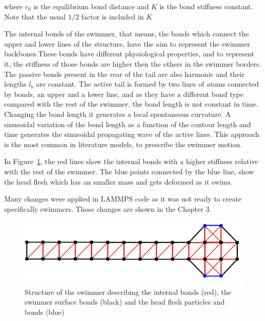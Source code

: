 where $r_{0}$ is the equilibrium bond distance and $K$ is the bond stiffness constant. Note that the usual $1/2$ factor is included in $K$ 

The internal bonds of the swimmer, that means, the bonds which connect the upper and lower lines of the structure, have the aim to represent the swimmer backbones.These bonds have
different physiological properties, and to represent it, the stiffness of those bonds are higher then the others in the swimmer borders. The passive bonds present in the 
rear of the tail are also harmonic and their lengths $l_{b}$ are constant. The active tail is formed by two lines of atoms connected by bonds, an upper and a lower line, and as
they have a different bond type compared with the rest of the swimmer, the bond length is not constant in time. Changing the bond length it generates
a local spontaneous curvature. A sinusoidal variation of the bond length as a function of the contour length and time generates the sinusoidal propagating wave of the active
lines. This approach is the most common in literature models, to prescribe the swimmer motion.\par

In Figure~\ref{fig:Bild2.7}, the red lines show the internal bonds with a higher stiffness relative with the rest of the swimmer. The blue points connected by the blue line, show the 
head flesh which has an smaller mass and gets deformed as it swims.\par
Many changes were applied in LAMMPS code as it was not ready to create specifically swimmers. Those changes are shown in the Chapter 3.


\begin{figure}[ht]
\centering
  \begin{footnotesize}
  \includegraphics[scale=0.25]{images/swimmer-compare.png}
  \caption[Structure of the swimmer describing the internal bonds (red), the swimmer surface bonds (black) and the head flesh particles and bonds(blue)]{Structure of the swimmer describing the internal bonds (red), the swimmer surface bonds (black) and the head flesh particles and bonds (blue)}
  \label{fig:Bild2.7}
  \end{footnotesize}
\end{figure} 



